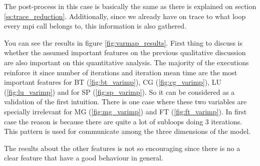 The post-process in this case is basically the same as there is explained on
section \ref{ss:trace_reduction}. Additionally, since we already have on trace
to what loop every mpi call belongs to, this information is also gathered.

You can see the results in figure \ref{fig:varmap_results}. First thing to
discuss is whether the assumed important features on the previous qualitative
discussion are also important on this quantitative analysis. The majority of the
executions reinforce it since number of iterations and iteration mean time are
the most important features for BT (\ref{fig:bt_varimp}), CG
(\ref{fig:cg_varimp}), LU (\ref{fig:lu_varimp}) and for SP
(\ref{fig:sp_varimp}). So it can be considered as a validation of the first
intuition. There is one case where these two variables are specially irrelevant
for MG (\ref{fig:mg_varimp}) and FT (\ref{fig:ft_varimp}). In first case the
reason is because there are quite a lot of subloops doing 3 iterations. This
pattern is used for communicate among the three dimensions of the model. 

The results about the other features is not so encouraging since there is no a
clear feature that have a good behaviour in general.


%
%


